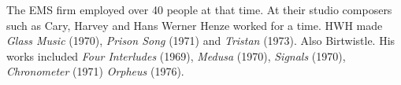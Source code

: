The EMS firm employed over 40 people at that time. At their studio composers such as Cary, Harvey and Hans Werner Henze worked for a time. HWH made \textit{Glass Music} (1970), \textit{Prison Song} (1971) and \textit{Tristan} (1973). Also Birtwistle.  His works included \textit{Four Interludes} (1969), \textit{Medusa} (1970), \textit{Signals} (1970), \textit{Chronometer} (1971) \textit{Orpheus} (1976). 






